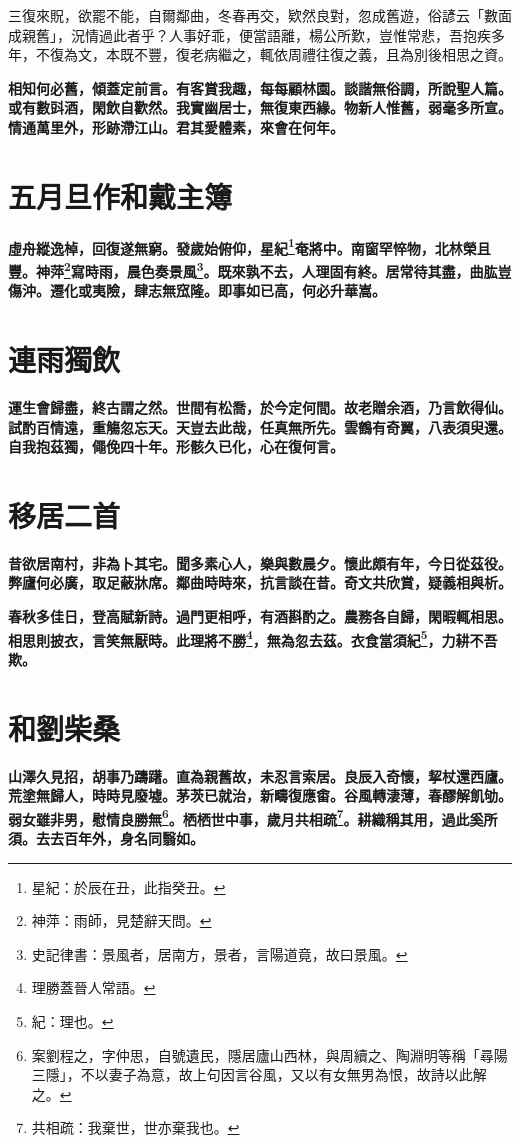 \begin{quoting}三復來貺，欲罷不能，自爾鄰曲，冬春再交，欵然良對，忽成舊遊，俗諺云「數面成親舊」，況情過此者乎？人事好乖，便當語離，楊公所歎，豈惟常悲，吾抱疾多年，不復為文，本既不豐，復老病繼之，輒依周禮往復之義，且為別後相思之資。\end{quoting}

\textbf{相知何必舊，傾蓋定前言。有客賞我趣，每每顧林園。談諧無俗調，所說聖人篇。或有數㪷酒，閑飲自歡然。我實幽居士，無復東西緣。物新人惟舊，弱毫多所宣。情通萬里外，形跡滯江山。君其愛體素，來會在何年。}

\section{五月旦作和戴主簿}

\textbf{虛舟縱逸棹，回復遂無窮。發歲始俯仰，星紀\footnote{星紀：於辰在丑，此指癸丑。}奄將中。南窗罕悴物，北林榮且豐。神萍\footnote{神萍：雨師，見楚辭天問。}寫時雨，晨色奏景風\footnote{史記律書：景風者，居南方，景者，言陽道竟，故曰景風。}。既來孰不去，人理固有終。居常待其盡，曲肱豈傷沖。遷化或夷險，肆志無窊隆。即事如已高，何必升華嵩。}

\section{連雨獨飲}

\textbf{運生會歸盡，終古謂之然。世間有松喬，於今定何間。故老贈余酒，乃言飲得仙。試酌百情遠，重觴忽忘天。天豈去此哉，任真無所先。雲鶴有奇翼，八表須臾還。自我抱茲獨，僶俛四十年。形骸久已化，心在復何言。}

\section{移居二首}

\textbf{昔欲居南村，非為卜其宅。聞多素心人，樂與數晨夕。懷此頗有年，今日從茲役。弊廬何必廣，取足蔽牀席。鄰曲時時來，抗言談在昔。奇文共欣賞，疑義相與析。}

\textbf{春秋多佳日，登高賦新詩。過門更相呼，有酒斟酌之。農務各自歸，閑暇輒相思。相思則披衣，言笑無厭時。此理將不勝\footnote{理勝蓋晉人常語。}，無為忽去茲。衣食當須紀\footnote{紀：理也。}，力耕不吾欺。}

\section{和劉柴桑}

\textbf{山澤久見招，胡事乃躊躇。直為親舊故，未忍言索居。良辰入奇懷，挈杖還西廬。荒塗無歸人，時時見廢墟。茅茨已就治，新疇復應畬。谷風轉淒薄，春醪解飢劬。弱女雖非男，慰情良勝無\footnote{案劉程之，字仲思，自號遺民，隱居廬山西林，與周續之、陶淵明等稱「尋陽三隱」，不以妻子為意，故上句因言谷風，又以有女無男為恨，故詩以此解之。}。栖栖世中事，歲月共相疏\footnote{共相疏：我棄世，世亦棄我也。}。耕織稱其用，過此奚所須。去去百年外，身名同翳如。}

